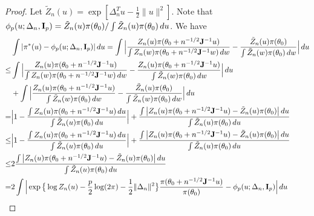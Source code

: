 \documentclass[11pt, letterpaper]{article}
\theoremstyle{plain}
\theoremstyle{definition}
\theoremstyle{remark}
\begin{document}
\begin{proof}
    Let $\tilde{Z}_n(u)=\exp[\Delta_n^T u - \frac{1}{2}\|u\|^2]$.
    Note that $\phi_p(u;\Delta_n,\mathbf{I}_p)=\tilde{Z}_n(u)\pi(\theta_0)/\int \tilde{Z}_n(u) \pi(\theta_0)\, du$.
    We have
    $$
    \begin{aligned}
        &\int | \pi^*(u) -\phi_p(u;\Delta_n,\mathbf{I}_p)| \, du
        =
    \int \Big| \frac{
Z_n(u) \pi(\theta_0+n^{-1/2} \mathbf{J}^{-1}u)
}{
    \int Z_n(w) \pi(\theta_0+n^{-1/2} \mathbf{J}^{-1}w) \, dw
}
        -
        \frac{\tilde{Z}_n(u)\pi(\theta_0)}{\int \tilde{Z}_n(w) \pi(\theta_0)\, dw}
        \Big| \, du
        \\
        \leq&
    \int \Big|
        \frac{
Z_n(u) \pi(\theta_0+n^{-1/2} \mathbf{J}^{-1}u)
}{
    \int Z_n(w) \pi(\theta_0+n^{-1/2} \mathbf{J}^{-1}w) \, dw
}
        -
        \frac{
Z_n(u) \pi(\theta_0+n^{-1/2} \mathbf{J}^{-1}u)
}{
\int \tilde{Z}_n(w) \pi(\theta_0)\, dw
}
        \Big| \, du
        \\
        &+
    \int \Big| 
        \frac{
Z_n(u) \pi(\theta_0+n^{-1/2} \mathbf{J}^{-1}u)
}{
\int \tilde{Z}_n(w) \pi(\theta_0)\, dw
}
        -
        \frac{\tilde{Z}_n(u)\pi(\theta_0)}{\int \tilde{Z}_n(w) \pi(\theta_0)\, dw}
        \Big| \, du\\
        =&
\Big| 
1-
        \frac{
    \int Z_n(u) \pi(\theta_0+n^{-1/2} \mathbf{J}^{-1}u) \, du
}{
       \int \tilde{Z}_n(u)\pi(\theta_0) \, du
}
        \Big|
        +
        \frac{
    \int \big|
Z_n(u) \pi(\theta_0+n^{-1/2} \mathbf{J}^{-1}u)
        -
            \tilde{Z}_n(u) \pi(\theta_0)
        \big| \, du
            }{
            \int \tilde{Z}_n(u)\pi(\theta_0) \, du
        }\\
        \leq&
\Big| 
1-
        \frac{
    \int Z_n(u) \pi(\theta_0+n^{-1/2} \mathbf{J}^{-1}u) \, du
}{
       \int \tilde{Z}_n(u)\pi(\theta_0) \, du
}
        \Big|
        +
        \frac{
    \int \big|
Z_n(u) \pi(\theta_0+n^{-1/2} \mathbf{J}^{-1}u)
        -
            \tilde{Z}_n(u) \pi(\theta_0)
        \big| \, du
            }{
            \int \tilde{Z}_n(u)\pi(\theta_0) \, du
        }\\
        \leq&
        2\frac{
    \int \big|
Z_n(u) \pi(\theta_0+n^{-1/2} \mathbf{J}^{-1}u)
        -
            \tilde{Z}_n(u) \pi(\theta_0)
        \big| \, du
            }{
            \int \tilde{Z}_n(u)\pi(\theta_0) \, du
        }\\
        =&
        2
    \int \Big|
\exp\big\{\log Z_n(u) -\frac{p}{2}\log (2\pi)-\frac{1}{2}\|\Delta_n\|^2\big\}
\frac{\pi(\theta_0+n^{-1/2} \mathbf{J}^{-1}u)}{\pi(\theta_0)}
        -
        \phi_p(u;\Delta_n,\mathbf{I}_p)
        \Big| \, du
    \end{aligned}
    $$


\end{proof}
\end{document}
